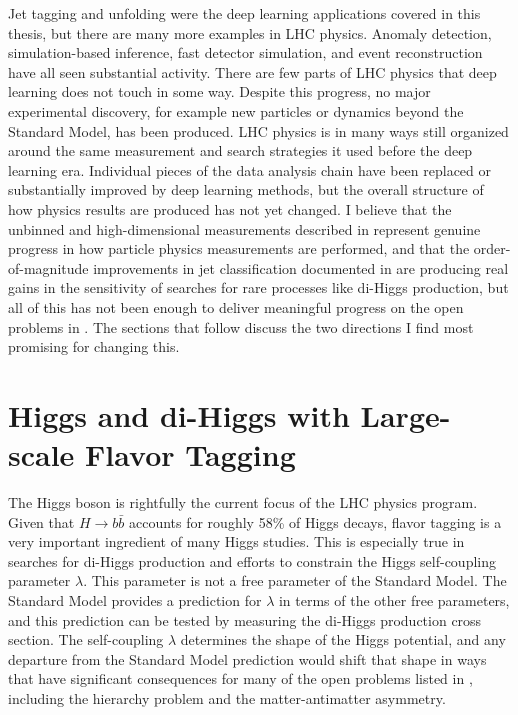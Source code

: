 Jet tagging and unfolding were the deep learning applications covered in this thesis, but there are many more examples in LHC physics.
Anomaly detection, simulation-based inference, fast detector simulation, and event reconstruction have all seen substantial activity.
There are few parts of LHC physics that deep learning does not touch in some way.
Despite this progress, no major experimental discovery, for example new particles or dynamics beyond the Standard Model, has been produced.
LHC physics is in many ways still organized around the same measurement and search strategies it used before the deep learning era.
Individual pieces of the data analysis chain have been replaced or substantially improved by deep learning methods, but the overall structure of how physics results are produced has not yet changed.
I believe that the unbinned and high-dimensional measurements described in  represent genuine progress in how particle physics measurements are performed, and that the order-of-magnitude improvements in jet classification documented in  are producing real gains in the sensitivity of searches for rare processes like di-Higgs production, but all of this has not been enough to deliver meaningful progress on the open problems in .
The sections that follow discuss the two directions I find most promising for changing this.

\section{Higgs and di-Higgs with Large-scale Flavor Tagging}
\label{sec:conclusion-dihiggs}

The Higgs boson is rightfully the current focus of the LHC physics program.
Given that $H \to b\bar{b}$ accounts for roughly 58\% of Higgs decays, flavor tagging is a very important ingredient of many Higgs studies.
This is especially true in searches for di-Higgs production and efforts to constrain the Higgs self-coupling parameter $\lambda$.
This parameter is not a free parameter of the Standard Model.
The Standard Model provides a prediction for $\lambda$ in terms of the other free parameters, and this prediction can be tested by measuring the di-Higgs production cross section.
The self-coupling $\lambda$ determines the shape of the Higgs potential, and any departure from the Standard Model prediction would shift that shape in ways that have significant consequences for many of the open problems listed in , including the hierarchy problem and the matter-antimatter asymmetry.

